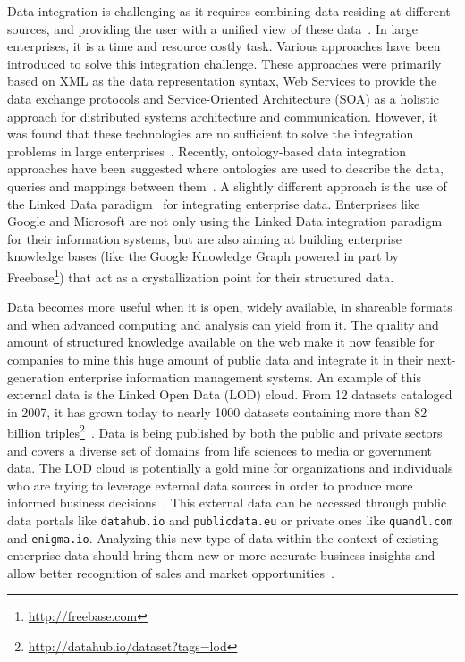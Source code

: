 Data integration is challenging as it requires combining data residing at different sources, and providing the user with a unified view of these data~\cite{Lenzerini:SIGMOD:02}. In large enterprises, it is a time and resource costly task. Various approaches have been introduced to solve this integration challenge. These approaches were primarily based on XML as the data representation syntax, Web Services to provide the data exchange protocols and Service-Oriented Architecture (SOA) as a holistic approach for distributed systems architecture and communication. However, it was found that these technologies are no sufficient to solve the integration problems in large enterprises~\cite{Frischmuth:ISWC:13,Frischmuth:SemWebJorunal:12}. Recently, ontology-based data integration approaches have been suggested where ontologies are used to describe the data, queries and mappings between them~\cite{Wache:IJCAI:01}. A slightly different approach is the use of the Linked Data paradigm~\cite{Bizer:IJSWIS:09} for integrating enterprise data. Enterprises like Google and Microsoft are not only using the Linked Data integration paradigm for their information systems, but are also aiming at building enterprise knowledge bases (like the Google Knowledge Graph powered in part by Freebase\footnote{\url{http://freebase.com}}) that act as a crystallization point for their structured data.

Data becomes more useful when it is open, widely available, in shareable formats and when advanced computing and analysis can yield from it. The quality and amount of structured knowledge available on the web make it now feasible for companies to mine this huge amount of public data and integrate it in their next-generation enterprise information management systems. An example of this external data is the Linked Open Data (LOD) cloud. From 12 datasets cataloged in 2007, it has grown today to nearly 1000 datasets containing more than 82 billion triples\footnote{\url{http://datahub.io/dataset?tags=lod}}~\cite{Bizer:IJSWIS:09}. Data is being published by both the public and private sectors and covers a diverse set of domains from life sciences to media or government data. The LOD cloud is potentially a gold mine for organizations and individuals who are trying to leverage external data sources in order to produce more informed business decisions~\cite{Boyd:Article:11}. This external data can be accessed through public data portals like \texttt{datahub.io} and \texttt{publicdata.eu} or private ones like \texttt{quandl.com} and \texttt{enigma.io}. Analyzing this new type of data within the context of existing enterprise data should bring them new or more accurate business insights and allow better recognition of sales and market opportunities~\cite{LaValle:MIT:11}.

